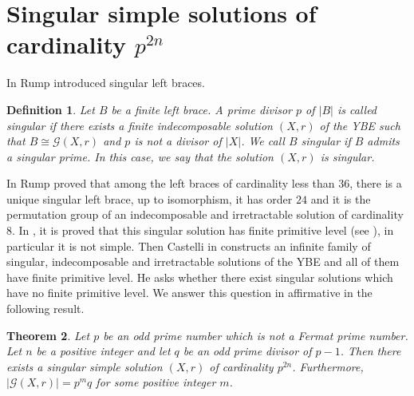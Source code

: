 \documentclass[10pt]{article}
\newtheorem{theorem}{Theorem}[section]
\newtheorem{definition}[theorem]{Definition}
\begin{document}
\section{Singular simple solutions of cardinality $p^{2n}$}\label{singular}

In \cite{Rump23} Rump introduced singular left braces.
\begin{definition}
	Let $B$ be a finite left brace. A prime divisor $p$ of $|B|$ is called singular if there exists a finite indecomposable solution $(X,r)$ of the YBE such that $B\cong\mathcal{G}(X,r)$ and $p$ is not a divisor of $|X|$. We call $B$ singular if $B$ admits a singular prime. In this case, we say that the solution $(X,r)$ is singular.
\end{definition}

In \cite{Rump23} Rump proved that among the left braces of cardinality less than $36$, there is a unique singular left brace, up to isomorphism, it has order $24$ and it is the permutation group of an indecomposable and irretractable solution of cardinality $8$. In \cite[Example 21]{Castelli}, it is proved that this singular solution has finite primitive level (see \cite{CO21}), in particular it is not simple. Then Castelli in \cite{Castelli} constructs an infinite family of singular, indecomposable and irretractable solutions of the YBE and all of them have finite primitive level. He asks whether there exist singular solutions which have no finite primitive level. We answer this question in affirmative in the following result.

\begin{theorem}
	Let $p$ be an odd prime number which is not a Fermat prime number. Let $n$ be a positive integer and let $q$ be an odd prime divisor of $p-1$. Then there exists a singular simple solution $(X,r)$ of cardinality $p^{2n}$. Furthermore, $|\mathcal{G}(X,r)|=p^mq$ for some positive integer $m$.
\end{theorem}
\end{document}

